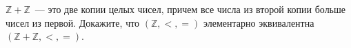 $\mathbb{Z} + \mathbb{Z}$~--- это две копии целых чисел, причем все числа из второй копии больше чисел из первой. Докажите,
что $(\mathbb{Z}, <, =)$ элементарно эквивалентна $(\mathbb{Z} + \mathbb{Z}, <, =)$.